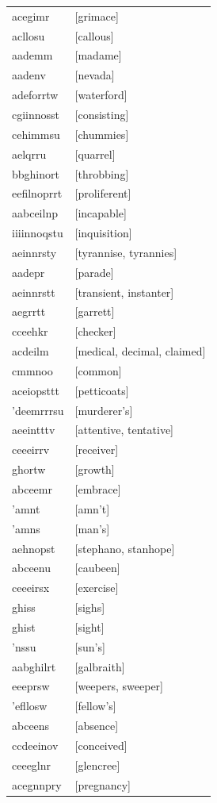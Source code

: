 \documentclass{article}
\begin{document}
\begin{tabular}{ll}
acegimr & [grimace] \\
acllosu & [callous] \\
aademm & [madame] \\
aadenv & [nevada] \\
adeforrtw & [waterford] \\
cgiinnosst & [consisting] \\
cehimmsu & [chummies] \\
aelqrru & [quarrel] \\
bbghinort & [throbbing] \\
eefilnoprrt & [proliferent] \\
aabceilnp & [incapable] \\
iiiinnoqstu & [inquisition] \\
aeinnrsty & [tyrannise, tyrannies] \\
aadepr & [parade] \\
aeinnrstt & [transient, instanter] \\
aegrrtt & [garrett] \\
cceehkr & [checker] \\
acdeilm & [medical, decimal, claimed] \\
cmmnoo & [common] \\
aceiopsttt & [petticoats] \\
'deemrrrsu & [murderer's] \\
aeeintttv & [attentive, tentative] \\
ceeeirrv & [receiver] \\
ghortw & [growth] \\
abceemr & [embrace] \\
'amnt & [amn't] \\
'amns & [man's] \\
aehnopst & [stephano, stanhope] \\
abceenu & [caubeen] \\
ceeeirsx & [exercise] \\
ghiss & [sighs] \\
ghist & [sight] \\
'nssu & [sun's] \\
aabghilrt & [galbraith] \\
eeeprsw & [weepers, sweeper] \\
'efllosw & [fellow's] \\
abceens & [absence] \\
ccdeeinov & [conceived] \\
ceeeglnr & [glencree] \\
acegnnpry & [pregnancy] \\

\end{tabular}
\end{document}
